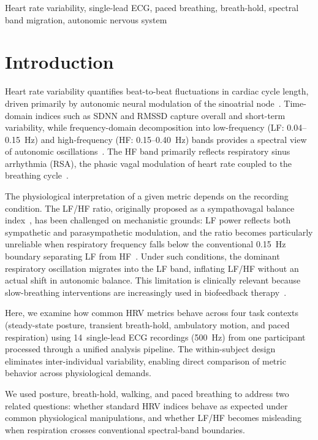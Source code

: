 \documentclass[conference]{IEEEtran}
\begin{document}
\begin{IEEEkeywords}
Heart rate variability, single-lead ECG, paced breathing, breath-hold,
spectral band migration, autonomic nervous system
\end{IEEEkeywords}

\section{Introduction}
\label{sec:intro}

Heart rate variability quantifies beat-to-beat fluctuations in cardiac
cycle length, driven primarily by autonomic neural modulation of the
sinoatrial node~\cite{taskforce1996}.
Time-domain indices such as SDNN and RMSSD capture overall and
short-term variability, while frequency-domain decomposition into
low-frequency (LF: 0.04--0.15~Hz) and high-frequency (HF:
0.15--0.40~Hz) bands provides a spectral view of autonomic
oscillations~\cite{taskforce1996}.
The HF band primarily reflects respiratory sinus arrhythmia (RSA),
the phasic vagal modulation of heart rate coupled to the breathing
cycle~\cite{hirsch1981}.

The physiological interpretation of a
given metric depends on the recording condition.
The LF/HF ratio, originally proposed as a sympathovagal balance
index~\cite{taskforce1996}, has been challenged on mechanistic
grounds: LF power reflects both sympathetic and parasympathetic
modulation, and the ratio becomes particularly unreliable when
respiratory frequency falls below the conventional 0.15~Hz boundary
separating LF from HF~\cite{billman2013,eckberg1997}.
Under such conditions, the dominant respiratory oscillation migrates
into the LF band, inflating LF/HF without an actual shift in
autonomic balance.
This limitation is clinically relevant because slow-breathing
interventions are increasingly used in biofeedback
therapy~\cite{lehrer2014}.

Here, we examine how common HRV metrics behave across four task
contexts (steady-state posture, transient breath-hold, ambulatory
motion, and paced respiration) using 14~single-lead ECG recordings
(500~Hz) from one participant processed through a unified analysis
pipeline. The within-subject design eliminates inter-individual
variability, enabling direct comparison of metric behavior across
physiological demands.

We used posture, breath-hold, walking, and paced breathing to address
two related questions: whether standard HRV indices behave as expected
under common physiological manipulations, and whether LF/HF becomes
misleading when respiration crosses conventional spectral-band
boundaries.
\end{document}
